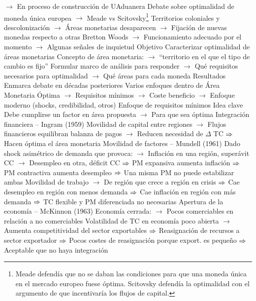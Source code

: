 \documentclass{nuevotema}
\begin{document}
\begin{esquemal}
				\4[] $\to$ En proceso de construcción de UAduanera
				\4[] Debate sobre optimalidad de moneda única europea
				\4[] $\to$ Meade vs Scitovsky\footnote{Meade defendía que no se daban las condiciones para que una moneda única en el mercado europeo fuese óptima. Scitovsky defendía la optimalidad con el argumento de que incentivaría los flujos de capital.}
				\4 Territorios coloniales y descolonización
				\4[] $\to$ Áreas monetarias desaparecen
				\4[] $\to$ Fijación de nuevas monedas respecto a otras
				\4 Bretton Woods
				\4[] $\to$ Funcionamiento adecuado por el momento
				\4[] $\to$ Algunas señales de inquietud
			\3 Objetivo
				\4 Caracterizar optimalidad de áreas monetarias
				\4[] Concepto de área monetaria:
				\4[] $\to$ ``territorio en el que el tipo de cambio es fijo''
				\4[] Formular marco de análisis para responder
				\4[] $\to$ Qué requisitos necesarios para optimalidad
				\4[] $\to$ Qué áreas para cada moneda
			\3 Resultados
				\4 Enmarca debate en décadas posteriores
				\4 Varios enfoques dentro de Área Monetaria Óptima
				\4[] $\to$ Requisitos mínimos
				\4[] $\to$ Coste beneficio
				\4[] $\to$ Enfoque moderno (shocks, credibilidad, otros)
		\2 Enfoque de requisitos mínimos
			\3 Idea clave
				\4 Debe cumplirse un factor en área propuesta
				\4[] $\to$ Para que sea óptima
			\3 Integración financiera -- Ingram (1959)
				\4 Movilidad de capital entre regiones
				\4[] $\to$ Flujos financieros equilibran balanza de pagos
				\4[] $\to$ Reducen necesidad de $\Delta$ TC
				\4[] $\Rightarrow$ Hacen óptima el área monetaria
			\3 Movilidad de factores -- Mundell (1961)
				\4 Dado shock asimétrico de demanda que provoca:
				\4[] $\to$ Inflación en una región, superávit CC
				\4[] $\to$ Desempleo en otra, déficit CC
				\4[] $\Rightarrow$ PM expansiva aumenta inflación
				\4[] $\Rightarrow$ PM contractiva aumenta desempleo
				\4[] $\Rightarrow$ Una misma PM no puede estabilizar ambas
				\4 Movilidad de trabajo
				\4[] $\to$ De región que crece a región en crisis
				\4[] $\Rightarrow$ Cae desempleo en región con menos demanda
				\4[] $\Rightarrow$ Cae inflación en región con más demanda
				\4[] $\Rightarrow$ TC flexible y PM diferenciada no necesarias
			\3 Apertura de la economía -- McKinnon (1963)
				\4 Economía cerrada:
				\4[] $\to$ Pocos comerciables en relación a no comerciables
				\4 Volatilidad de TC en economía poco abierta
				\4[] $\to$ Aumenta competitividad del sector exportables
				\4[] $\Rightarrow$ Reasignación de recursos a sector exportador
				\4[] $\Rightarrow$ Pocos costes de reasignación porque export. es pequeño
				\4[] $\Rightarrow$ Aceptable que no haya integración

\end{esquemal}
\end{document}
